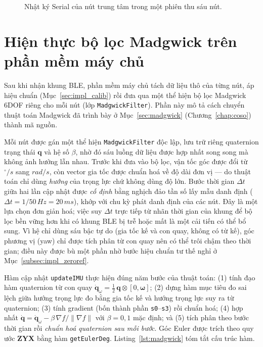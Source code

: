 \documentclass[../DoAn.tex]{subfiles}
\begin{document}
\begin{figure}[H]
    \centering
    \caption{Nhật ký Serial của nút trung tâm trong một phiên thu sáu nút.}
    \label{fig:serial_master}
\end{figure}


\section{Hiện thực bộ lọc Madgwick trên phần mềm máy chủ}
\label{sec:impl_madgwick}

Sau khi nhận khung BLE, phần mềm máy chủ tách dữ liệu thô của từng nút, áp hiệu chuẩn (Mục~\ref{sec:impl_calib}) rồi đưa qua một thể hiện bộ lọc Madgwick 6DOF riêng cho mỗi nút (lớp \texttt{MadgwickFilter}). Phần này mô tả cách chuyển thuật toán Madgwick đã trình bày ở Mục~\ref{sec:madgwick} (Chương~\ref{chap:coso}) thành mã nguồn.

Mỗi nút được gán một thể hiện \texttt{MadgwickFilter} độc lập, lưu trữ riêng quaternion trạng thái $\mathbf{q}$ và hệ số $\beta$, nhờ đó sáu luồng dữ liệu được hợp nhất song song mà không ảnh hưởng lẫn nhau. Trước khi đưa vào bộ lọc, vận tốc góc được đổi từ $^{\circ}/\si{s}$ sang $\si{rad/s}$, còn vector gia tốc được chuẩn hoá về độ dài đơn vị --- do thuật toán chỉ dùng \emph{hướng} của trọng lực chứ không dùng độ lớn. Bước thời gian $\Delta t$ giữa hai lần cập nhật được \emph{cố định} bằng nghịch đảo tần số lấy mẫu danh định ($\Delta t = 1/50\,\si{Hz} = 20\,\si{ms}$), khớp với chu kỳ phát danh định của các nút. Đây là một lựa chọn đơn giản hoá; việc suy $\Delta t$ trực tiếp từ nhãn thời gian của khung để bộ lọc bền vững hơn khi có khung BLE bị trễ hoặc mất là một cải tiến có thể bổ sung. Vì hệ chỉ dùng sáu bậc tự do (gia tốc kế và con quay, không có từ kế), góc phương vị (yaw) chỉ được tích phân từ con quay nên có thể trôi chậm theo thời gian; điều này được bù một phần nhờ bước hiệu chuẩn tư thế nghỉ ở Mục~\ref{subsec:impl_zeroref}.

Hàm cập nhật \texttt{updateIMU} thực hiện đúng năm bước của thuật toán: (1) tính đạo hàm quaternion từ con quay $\dot{\mathbf q}_\omega = \tfrac{1}{2}\,\mathbf q \otimes [0,\boldsymbol\omega]$; (2) dựng hàm mục tiêu đo sai lệch giữa hướng trọng lực đo bằng gia tốc kế và hướng trọng lực suy ra từ quaternion; (3) tính gradient (bốn thành phần \texttt{s0}--\texttt{s3}) rồi chuẩn hoá; (4) hợp nhất $\dot{\mathbf q} = \dot{\mathbf q}_\omega - \beta\,\nabla f/\lVert\nabla f\rVert$ với $\beta = 0{,}1$ mặc định; và (5) tích phân theo bước thời gian rồi \emph{chuẩn hoá quaternion sau mỗi bước}. Góc Euler được trích theo quy ước \textbf{ZYX} bằng hàm \texttt{getEulerDeg}. Listing~\ref{lst:madgwick} tóm tắt cấu trúc hàm.
\end{document}
